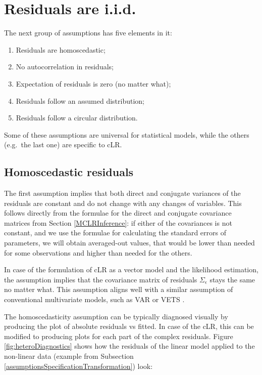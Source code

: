 \documentclass[
]{book}
\providecommand{\tightlist}{%
  \setlength{\itemsep}{0pt}\setlength{\parskip}{0pt}}
\begin{document}
\hypertarget{assumptionsResiduals}{%
\section{Residuals are i.i.d.}\label{assumptionsResiduals}}

The next group of assumptions has five elements in it:

\begin{enumerate}
\def\labelenumi{\arabic{enumi}.}
\tightlist
\item
  Residuals are homoscedastic;
\item
  No autocorrelation in residuals;
\item
  Expectation of residuals is zero (no matter what);
\item
  Residuals follow an assumed distribution;
\item
  Residuals follow a circular distribution.
\end{enumerate}

Some of these assumptions are universal for statistical models, while the others (e.g.~the last one) are specific to cLR.

\hypertarget{assumptionsResidualsHomoscedastic}{%
\subsection{Homoscedastic residuals}\label{assumptionsResidualsHomoscedastic}}

The first assumption implies that both direct and conjugate variances of the residuals are constant and do not change with any changes of variables. This follows directly from the formulae for the direct and conjugate covariance matrices from Section \ref{MCLRInference}: if either of the covariances is not constant, and we use the formulae for calculating the standard errors of parameters, we will obtain averaged-out values, that would be lower than needed for some observations and higher than needed for the others.

In case of the formulation of cLR as a vector model and the likelihood estimation, the assumption implies that the covariance matrix of residuals \(\Sigma_\epsilon\) stays the same no matter what. This assumption aligns well with a similar assumption of conventional multivariate models, such as VAR \citep{Lutkepohl2005} or VETS \citep{Svetunkov2021a}.

The homoscedasticity assumption can be typically diagnosed visually by producing the plot of absolute residuals vs fitted. In case of the cLR, this can be modified to producing plots for each part of the complex residuals. Figure \ref{fig:heteroDiagnostics} shows how the residuals of the linear model applied to the non-linear data (example from Subsection \ref{assumptionsSpecificationTransformation}) look:
\end{document}
